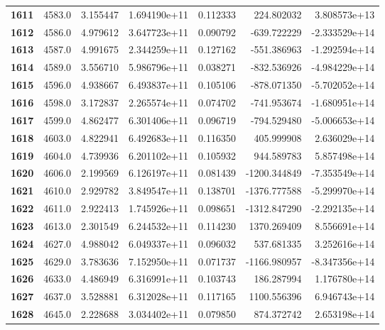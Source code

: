\documentclass{report}[12pt]
\begin{document}
\begin{center}
\begin{tabular}{lrrrrrr}
\textbf{1611} &         4583.0 &   3.155447 &  1.694190e+11 &    0.112333 &   224.802032 &  3.808573e+13 \\
\textbf{1612} &         4586.0 &   4.979612 &  3.647723e+11 &    0.090792 &  -639.722229 & -2.333529e+14 \\
\textbf{1613} &         4587.0 &   4.991675 &  2.344259e+11 &    0.127162 &  -551.386963 & -1.292594e+14 \\
\textbf{1614} &         4589.0 &   3.556710 &  5.986796e+11 &    0.038271 &  -832.536926 & -4.984229e+14 \\
\textbf{1615} &         4596.0 &   4.938667 &  6.493837e+11 &    0.105106 &  -878.071350 & -5.702052e+14 \\
\textbf{1616} &         4598.0 &   3.172837 &  2.265574e+11 &    0.074702 &  -741.953674 & -1.680951e+14 \\
\textbf{1617} &         4599.0 &   4.862477 &  6.301406e+11 &    0.096719 &  -794.529480 & -5.006653e+14 \\
\textbf{1618} &         4603.0 &   4.822941 &  6.492683e+11 &    0.116350 &   405.999908 &  2.636029e+14 \\
\textbf{1619} &         4604.0 &   4.739936 &  6.201102e+11 &    0.105932 &   944.589783 &  5.857498e+14 \\
\textbf{1620} &         4606.0 &   2.199569 &  6.126197e+11 &    0.081439 & -1200.344849 & -7.353549e+14 \\
\textbf{1621} &         4610.0 &   2.929782 &  3.849547e+11 &    0.138701 & -1376.777588 & -5.299970e+14 \\
\textbf{1622} &         4611.0 &   2.922413 &  1.745926e+11 &    0.098651 & -1312.847290 & -2.292135e+14 \\
\textbf{1623} &         4613.0 &   2.301549 &  6.244532e+11 &    0.114230 &  1370.269409 &  8.556691e+14 \\
\textbf{1624} &         4627.0 &   4.988042 &  6.049337e+11 &    0.096032 &   537.681335 &  3.252616e+14 \\
\textbf{1625} &         4629.0 &   3.783636 &  7.152950e+11 &    0.071737 & -1166.980957 & -8.347356e+14 \\
\textbf{1626} &         4633.0 &   4.486949 &  6.316991e+11 &    0.103743 &   186.287994 &  1.176780e+14 \\
\textbf{1627} &         4637.0 &   3.528881 &  6.312028e+11 &    0.117165 &  1100.556396 &  6.946743e+14 \\
\textbf{1628} &         4645.0 &   2.228688 &  3.034402e+11 &    0.079850 &   874.372742 &  2.653198e+14 \\

\end{tabular}
\end{center}
\end{document}
